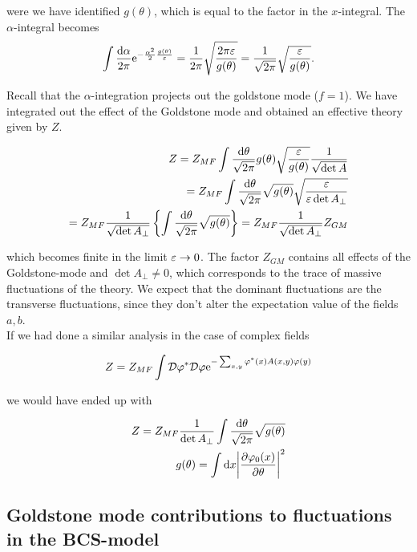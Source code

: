 were we have identified $g(\theta)$, which is equal to the factor in the $x$-integral. The $\alpha$-integral becomes 
\begin{align*}
    \int \frac{\dd \alpha}{2\pi} \mathrm{e}^{-\frac{\alpha^2}{2}\frac{g(\theta)}{\varepsilon}} = \frac{1}{2\pi}\sqrt{\frac{2\pi \varepsilon}{g(\theta)}} =  \frac{1}{\sqrt{
    2\pi}}\sqrt{\frac{\varepsilon}{g(\theta)}}. 
\end{align*}

Recall that the $\alpha$-integration projects out the goldstone mode ($f = 1$). We have integrated out the effect of the Goldstone mode and obtained an effective theory given by $Z$. 

\begin{align*}
    Z = Z_{MF}\int \frac{\dd \theta}{\sqrt{2\pi}} g(\theta) \sqrt{\frac{\varepsilon}{g(\theta)}} \frac{1}{\sqrt{\det A}} \\
    = Z_{MF}\int \frac{\dd \theta}{\sqrt{2\pi}} \sqrt{
    g(\theta)} \sqrt{\frac{\varepsilon}{\varepsilon\det A_\perp}} \\ 
    = Z_{MF} \frac{1}{\sqrt{\det A_\perp}} \left\{ \int \frac{\dd \theta}{\sqrt{2\pi}}\sqrt{g(\theta)} \right\} = Z_{MF} \frac{1}{\sqrt{\det A_\perp}} Z_{GM}
\end{align*}

which becomes finite in the limit $\varepsilon \to 0$. The factor $Z_{GM}$ contains all effects of the Goldstone-mode and $\det A_\perp \neq 0$, which corresponds to the trace of massive fluctuations of the theory. We expect that the dominant fluctuations are the transverse fluctuations, since they don't alter the expectation value of the fields $a,b$. \\ 

If we had done a similar analysis in the case of complex fields

\begin{align*}
    Z = Z_{MF} \int \mathcal{D} \varphi^* \mathcal{D} \varphi \mathrm{e}^{-\sum_{x,y} \varphi^*(x) A(x,y) \varphi (y)}
\end{align*}

we would have ended up with 

\begin{align*}
    Z = Z_{MF} \frac{1}{\det A_\perp} \int \frac{\dd \theta}{\sqrt{2\pi}}\sqrt{g(\theta)} \\ g(\theta) = \int \dd x \abs{\pdv{\varphi_0(x)}{\theta}}^2 
\end{align*}

\subsection{Goldstone mode contributions to fluctuations in the BCS-model}

